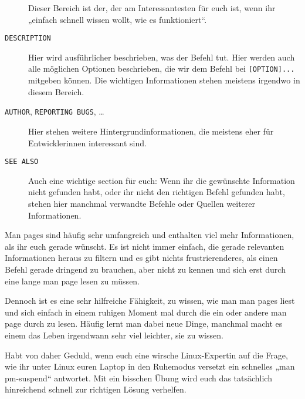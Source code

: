 \begin{praxis}
\begin{description}
              Dieser Bereich ist der, der am Interessantesten für euch ist, wenn ihr
              „einfach schnell wissen wollt, wie es funktioniert“.
        \item[\texttt{DESCRIPTION}]
              Hier wird ausführlicher beschrieben, was der Befehl tut. Hier werden
              auch alle möglichen Optionen beschrieben, die wir dem Befehl bei
              \texttt{[OPTION]...} mitgeben können. Die wichtigen Informationen
              stehen meistens irgendwo in diesem Bereich.
        \item[\texttt{AUTHOR}, \texttt{REPORTING BUGS}, \dots]
              Hier stehen weitere Hintergrundinformationen, die meistens eher für
              Entwicklerinnen interessant sind.
        \item[\texttt{SEE ALSO}]
              Auch eine wichtige section für euch: Wenn ihr die gewünschte
              Information nicht gefunden habt, oder ihr nicht den richtigen Befehl
              gefunden habt, stehen hier manchmal verwandte Befehle oder Quellen
              weiterer Informationen.
    \end{description}

    Man pages sind häufig sehr umfangreich und enthalten viel mehr Informationen,
    als ihr euch gerade wünscht. Es ist nicht immer einfach, die gerade relevanten
    Informationen heraus zu filtern und es gibt nichts frustrierenderes, als einen
    Befehl gerade dringend zu brauchen, aber nicht zu kennen und sich erst durch
    eine lange man page lesen zu müssen.

    Dennoch ist es eine sehr hilfreiche Fähigkeit, zu wissen, wie man man pages
    liest und sich einfach in einem ruhigen Moment mal durch die ein oder andere
    man page durch zu lesen. Häufig lernt man dabei neue Dinge, manchmal macht es
    einem das Leben irgendwann sehr viel leichter, sie zu wissen.

    Habt von daher Geduld, wenn euch eine wirsche Linux-Expertin auf die Frage, wie
    ihr unter Linux euren Laptop in den Ruhemodus versetzt ein schnelles „man
    pm-suspend“ antwortet. Mit ein bisschen Übung wird euch das tatsächlich
    hinreichend schnell zur richtigen Lösung verhelfen.


\end{praxis}
